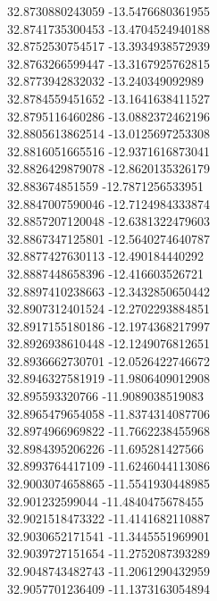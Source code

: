 {32.8730880243059	-13.5476680361955\\
32.8741735300453	-13.4704524940188\\
32.8752530754517	-13.3934938572939\\
32.8763266599447	-13.3167925762815\\
32.8773942832032	-13.240349092989\\
32.8784559451652	-13.1641638411527\\
32.8795116460286	-13.0882372462196\\
32.8805613862514	-13.0125697253308\\
32.8816051665516	-12.9371616873041\\
32.8826429879078	-12.8620135326179\\
32.883674851559	-12.7871256533951\\
32.8847007590046	-12.7124984333874\\
32.8857207120048	-12.6381322479603\\
32.8867347125801	-12.5640274640787\\
32.8877427630113	-12.490184440292\\
32.8887448658396	-12.416603526721\\
32.8897410238663	-12.3432850650442\\
32.8907312401524	-12.2702293884851\\
32.8917155180186	-12.1974368217997\\
32.8926938610448	-12.1249076812651\\
32.8936662730701	-12.0526422746672\\
32.8946327581919	-11.9806409012908\\
32.895593320766	-11.9089038519083\\
32.8965479654058	-11.8374314087706\\
32.8974966969822	-11.7662238455968\\
32.8984395206226	-11.695281427566\\
32.8993764417109	-11.6246044113086\\
32.9003074658865	-11.5541930448985\\
32.901232599044	-11.4840475678455\\
32.9021518473322	-11.4141682110887\\
32.9030652171541	-11.3445551969901\\
32.9039727151654	-11.2752087393289\\
32.9048743482743	-11.2061290432959\\
32.9057701236409	-11.1373163054894\\
}
